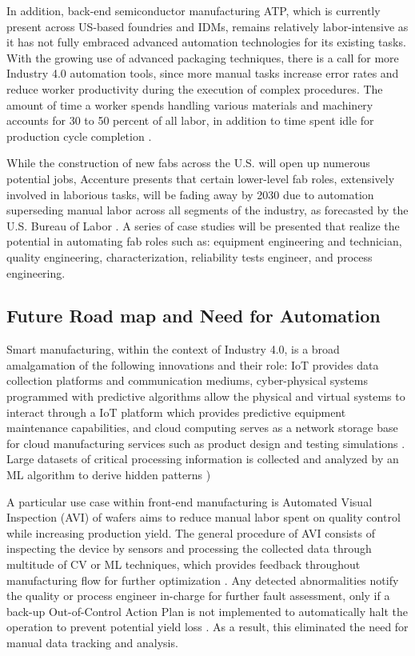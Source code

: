 In addition, back-end semiconductor manufacturing ATP, which is currently present across US-based foundries and IDMs, remains relatively labor-intensive as it has not fully embraced advanced automation technologies for its existing tasks. With the growing use of advanced packaging techniques, there is a call for more Industry 4.0 automation tools, since more manual tasks increase error rates and reduce worker productivity during the execution of complex procedures. The amount of time a worker spends handling various materials and machinery accounts for 30 to 50 percent of all labor, in addition to time spent idle for production cycle completion \cite{De_Backer2017-qd}.  

While the construction of new fabs across the U.S. will open up numerous potential jobs, Accenture presents that certain lower-level fab roles, extensively involved in laborious tasks, will be fading away by 2030 due to automation superseding manual labor across all segments of the industry, as forecasted by the U.S. Bureau of Labor \cite{Alam2023-hc}. A series of case studies will be presented that realize the potential in automating fab roles such as: equipment engineering and technician, quality engineering, characterization, reliability tests engineer, and process engineering. 
 
\subsection{Future Road map and Need for Automation }\label{sec7_2:cases}
Smart manufacturing, within the context of Industry 4.0, is a broad amalgamation of the following innovations and their role: IoT provides data collection platforms and communication mediums, cyber-physical systems programmed with predictive algorithms allow the physical and virtual systems to interact through a IoT platform which provides predictive equipment maintenance capabilities, and cloud computing serves as a network storage base for cloud manufacturing services such as product design and testing simulations \cite{Lin2017DevelopmentOA}. Large datasets of critical processing information is collected and analyzed by an ML algorithm to derive hidden patterns \cite{Khakifirooz2017BayesianIF})

 
 A particular use case within front-end manufacturing is Automated Visual Inspection (AVI) of wafers aims to reduce manual labor spent on quality control while increasing production yield. The general procedure of AVI consists of inspecting the device by sensors and processing the collected data through multitude of CV or ML techniques, which provides feedback throughout manufacturing flow for further optimization \cite{Huang2015AutomatedVI}. Any detected abnormalities notify the quality or process engineer in-charge for further fault assessment, only if a back-up Out-of-Control Action Plan is not implemented to automatically halt the operation to prevent potential yield loss \cite{Barar2020TakingEA}. As a result, this eliminated the need for manual data tracking and analysis.
